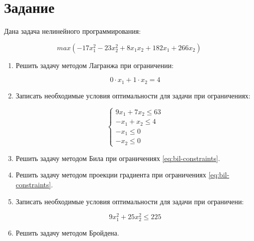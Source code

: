 





\section{Задание}

Дана задача нелинейного программирования:

\begin{equation}
\label{eq:target}
	max \left( -17 x^2_1 - 23 x^2_2 + 8 x_1 x_2 + 182 x_1 + 266 x_2 \right)
\end{equation}

\begin{enumerate}

	\item Решить задачу методом Лагранжа при ограничении: 
	
		\begin{equation}
		\label{eq:lagrange-constraints}
			0 \cdot x_1 + 1 \cdot x_2 = 4
		\end{equation}
	
	\item Записать необходимые условия оптимальности для задачи при ограничениях:
	
		\begin{equation}
		\label{eq:bil-constraints}
			\begin{cases}
				9 x_1 + 7 x_2 \leq 63
				\\
				-x_1 + x_2 \leq 4
				\\
				-x_1 \leq 0
				\\
				-x_2 \leq 0
			\end{cases}
		\end{equation}
	
	\item Решить задачу методом Била при ограничениях \ref{eq:bil-constraints}.
	
	\item Решить задачу методом проекции градиента при ограничениях \ref{eq:bil-constraints}.	
	
	\item Записать необходимые условия оптимальности для задачи при ограничени:
	
	\begin{equation}
	\label{eq:quad-constraints}
		9 x_1^2 + 25 x_2^2 \leq 225
	\end{equation}

	\item Решить задачу методом Бройдена.

\end{enumerate}

